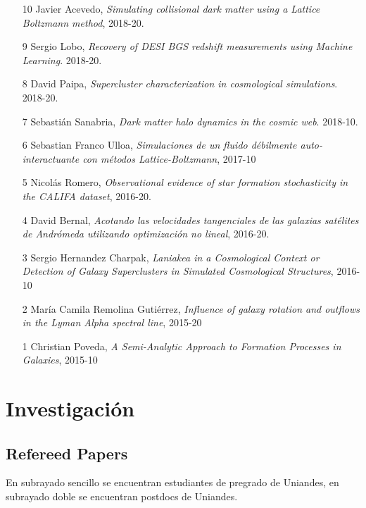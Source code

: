 \documentclass{article}
\begin{document}
\begin{itemize}
\item [10] Javier Acevedo, \emph{Simulating collisional dark matter using a
  Lattice Boltzmann method}, 2018-20.  
\item [9] Sergio Lobo, \emph{Recovery of DESI BGS redshift
  measurements using Machine Learning}. 2018-20.  
\item [8] David Paipa, \emph{Supercluster characterization in
  cosmological simulations}. 2018-20. 
\item [7] Sebasti\'an Sanabria, \emph{Dark matter halo dynamics in the
  cosmic web}. 2018-10. 
\item [6] Sebastian Franco Ulloa, \emph{Simulaciones de un fluido
  débilmente auto-interactuante con métodos Lattice-Boltzmann},
  2017-10
\item [5] Nicol\'as Romero, \emph{Observational evidence of star formation
  stochasticity in the CALIFA dataset}, 2016-20.
\item [4] David Bernal, \emph{Acotando las velocidades tangenciales de las
  galaxias satélites de Andrómeda utilizando optimización no lineal}, 2016-20.
\item [3] Sergio Hernandez Charpak, \emph{Laniakea in a Cosmological
  Context or Detection of Galaxy Superclusters in Simulated
  Cosmological Structures}, 2016-10
\item [2] Mar\'ia Camila Remolina Guti\'errez, \emph{Influence of galaxy
  rotation and outflows in the Lyman Alpha spectral line}, 2015-20
\item [1] Christian Poveda, \emph{A Semi-Analytic Approach to Formation
  Processes in Galaxies}, 2015-10
\end{itemize}


\newpage
\section{Investigaci\'on}

\subsection{Refereed Papers}

En subrayado sencillo se encuentran estudiantes de pregrado de
Uniandes, en subrayado doble se encuentran postdocs de Uniandes.
\end{document}
